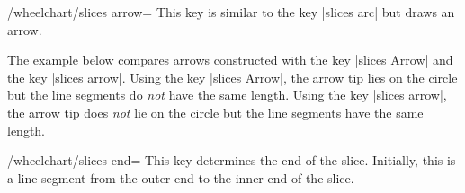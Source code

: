\documentclass[a4paper,english,dvipsnames]{ltxdoc}
\begin{document}
\begin{key}{/wheelchart/slices arrow=}
This key is similar to the key |slices arc| but draws an arrow.
\begin{codeexample}[width=10cm]
\begin{tikzpicture}
\wheelchart[
  gap=0.3,
  slices arrow={1}{-1}
]{\exampleforthismanual}
\end{tikzpicture}
\end{codeexample}
The example below compares arrows constructed with the key |slices Arrow| and the key |slices arrow|. Using the key |slices Arrow|, the arrow tip lies on the circle but the line segments do \emph{not} have the same length. Using the key |slices arrow|, the arrow tip does \emph{not} lie on the circle but the line segments have the same length.
\begin{codeexample}[width=10cm]
\end{codeexample}
\end{key}
\begin{key}{/wheelchart/slices end=}
This key determines the end of the slice. Initially, this is a line segment from the outer end to the inner end of the slice.
\end{key}
\end{document}
